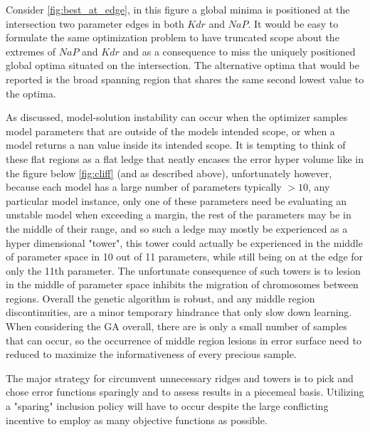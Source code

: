 Consider \ref{fig:best_at_edge}, in this figure a global minima is positioned at the intersection two parameter edges in both $Kdr$ and $NaP$. It would be easy to formulate the same optimization problem to have truncated scope about the extremes of $NaP$ and $Kdr$ and as a consequence to miss the uniquely positioned global optima situated on the intersection. The alternative optima that would be reported is the broad spanning region that shares the same second lowest value to the optima. 

As discussed, model-solution instability can occur when the optimizer samples model parameters that are outside of the models intended scope, or when a model returns a nan value inside its intended scope. It is tempting to think of these flat regions as a flat ledge that neatly encases the error hyper volume like in the figure below \ref{fig:cliff} (and as described above), unfortunately however, because each model has a large number of parameters typically $>10$, any particular model instance, only one of these parameters need be evaluating an unstable model when exceeding a margin, the rest of the parameters may be in the middle of their range, and so such a ledge may mostly be experienced as a hyper dimensional "tower", this tower could actually be experienced in the middle of parameter space in 10 out of 11 parameters, while still being on at the edge for only the 11th parameter. The unfortunate consequence of such towers is to lesion in the middle of parameter space inhibits the migration of chromosomes between regions. Overall the genetic algorithm is robust, and any middle region discontinuities, are a minor temporary hindrance that only slow down learning. When considering the GA overall, there are is only a small number of samples that can occur, so the occurrence of middle region lesions in error surface need to reduced  to maximize the informativeness of every precious sample. 

The major strategy for circumvent unnecessary ridges and towers is to pick and chose error functions sparingly and to assess results in a piecemeal basis. Utilizing a "sparing" inclusion policy will have to occur despite the large conflicting incentive to employ as many objective functions as possible.



